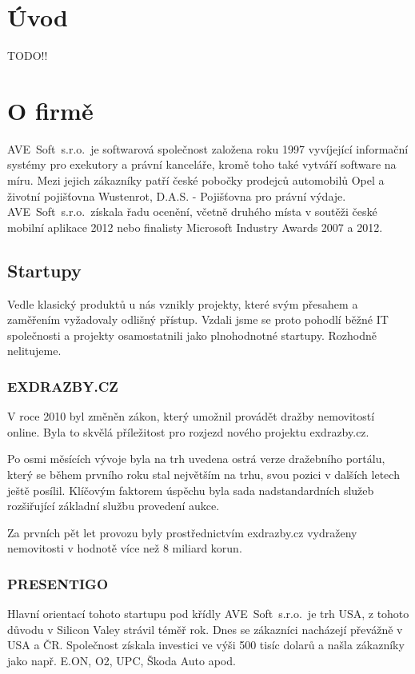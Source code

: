 \documentclass[czech,bachelor,dept460,male,csharp]{diploma}
\newcommand{\AveSoft}{AVE~Soft~s.r.o.}
\begin{document}
\MakeTitlePages

\section{Úvod}
TODO!!

\section{O firmě}
	\AveSoft\ je softwarová společnost založena roku 1997 vyvíjející informační systémy pro exekutory a právní kanceláře, kromě toho také vytváří software na míru.
	Mezi jejich zákazníky patří české pobočky prodejců automobilů Opel a životní pojišťovna Wustenrot, D.A.S. - Pojišťovna pro právní výdaje.
	\AveSoft\ získala řadu ocenění, včetně druhého místa v soutěži české mobilní aplikace 2012 nebo finalisty Microsoft Industry Awards 2007 a 2012.
	\subsection{Startupy}
	Vedle klasický produktů u nás vznikly projekty, které svým přesahem a zaměřením vyžadovaly odlišný přístup. Vzdali jsme se proto pohodlí běžné IT společnosti a projekty osamostatnili jako plnohodnotné startupy. Rozhodně nelitujeme. 
 		\subsubsection{EXDRAZBY.CZ}
 		V roce 2010 byl změněn zákon, který umožnil provádět dražby nemovitostí online. Byla to skvělá příležitost pro rozjezd nového projektu exdrazby.cz.

		Po osmi měsících vývoje byla na trh uvedena ostrá verze dražebního portálu, který se během prvního roku stal největším na trhu, svou pozici v dalších letech ještě posílil. Klíčovým faktorem úspěchu byla sada nadstandardních služeb rozšiřující základní službu provedení aukce.

		Za prvních pět let provozu byly prostřednictvím exdrazby.cz vydraženy nemovitosti v hodnotě více než 8 miliard korun.
 		\subsubsection{PRESENTIGO}
 		Hlavní orientací tohoto startupu pod křídly \AveSoft\ je trh USA, z tohoto důvodu v Silicon Valey strávil téměř rok. Dnes se zákazníci nacházejí převážně v USA a ČR. Společnost získala investici ve výši 500 tisíc dolarů a našla zákazníky jako např. E.ON, O2, UPC, Škoda Auto apod.
\end{document}
